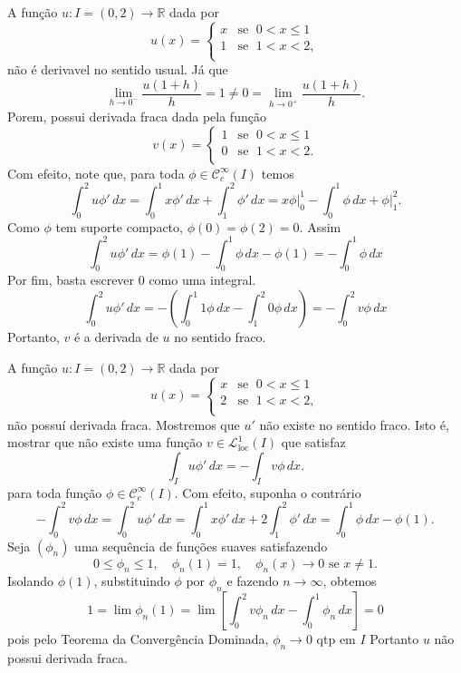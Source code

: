 \documentclass[a4paper, 11pt]{book}
\theoremstyle{definition}
\newcommand{\bR}{\mathbb{R}}
\newcommand{\cC}{\mathcal{C}}
\newcommand{\cL}{\mathcal{L}}
\newcommand{\loc}{\mathrm{loc}}
\begin{document}
\begin{ex} \label{ex:derivada-fraca-R}
    A função $u : I  =(0,2) \to \bR$ dada por
    \[
        u(x) = \left\{
            \begin{array}{rl}
                x & \text{se }\; 0 < x \leqslant 1\\
                1 & \text{se }\; 1 < x < 2,\\
            \end{array}
        \right.
    \]
    não é derivavel no sentido usual. Já que
    \[
        \lim_{h\to0^-} \frac{u(1 + h)}{h} = 1 \neq 0 = \lim_{h\to0^+} \frac{u(1 + h)}{h}.
    \]
    Porem, possui derivada fraca dada pela função
    \[
        v(x) = \left\{
            \begin{array}{rl}
                1 & \text{se }\; 0 < x \leqslant 1\\
                0 & \text{se }\; 1 < x < 2.\\
            \end{array}
        \right.
    \]
    Com efeito, note que, para toda $\phi \in \cC^\infty_c(I)$ temos
    \[
        \int_0^2 u \phi' \,dx = \int_0^1 x \phi' \,dx + \int_1^2 \phi' \,dx = x \phi \bigg|_0^1 - \int_0^1 \phi \,dx + \phi \bigg|_1^2.
    \]
    Como $\phi$ tem suporte compacto, $\phi(0) = \phi(2) = 0$. Assim
    \[
        \int_0^2 u \phi' \,dx = \phi(1) - \int_0^1 \phi \,dx - \phi(1) = -\int_0^1 \phi \,dx
    \]
    Por fim, basta escrever $0$ como uma integral.
    \[
        \int_0^2 u \phi' \,dx = - \left(  \int_0^1 1\phi \, dx - \int_1^2 0\phi \,dx  \right) = -\int_0^2 v \phi \,dx
    \]
    Portanto, $v$ é a derivada de $u$ no sentido fraco.
\end{ex}

\begin{ex}
    A função $u : I  = (0,2) \to \bR$ dada por
    \[
        u(x) = \left\{
            \begin{array}{rl}
                x & \text{se }\; 0 < x \leqslant 1\\
                2 & \text{se }\; 1 < x < 2,\\
            \end{array}
        \right.
    \]
    não possuí derivada fraca.
    Mostremos que $u'$ não existe no sentido fraco.
    Isto é, mostrar que não existe uma função $v \in \cL^1_\loc(I)$ que satisfaz
    \[
        \int_I u \phi' \, dx = -\int_I v \phi \,dx.
    \]
    para toda função $\phi \in \cC_c^\infty(I)$. 
    Com efeito, suponha o contrário
    \[
        -\int_0^2 v \phi \, dx = \int_0^2 u \phi' \,dx = \int_0^1 x \phi' \,dx + 2\int_1^2 \phi' \,dx = \int_0^1 \phi \,dx - \phi(1).
    \]
    Seja $(\phi_n)$ uma sequência de funções suaves satisfazendo
    \[
        0 \leqslant \phi_n \leqslant 1, \quad \phi_n(1) = 1, \quad \phi_n(x) \to 0 \text{ se } x \neq 1.
    \]
    Isolando $\phi(1)$, substituindo $\phi$ por $\phi_n$ e fazendo $n \to \infty$, obtemos
    \[
        1 = \lim \phi_n(1) = \lim \left[ \int_0^2 v \phi_n \, dx- \int_0^1 \phi_n \,dx \right] = 0
    \]
    pois pelo Teorema da Convergência Dominada, $\phi_n \to 0$ qtp em $I$
    Portanto $u$ não possui derivada fraca.
\end{ex}
\end{document}
